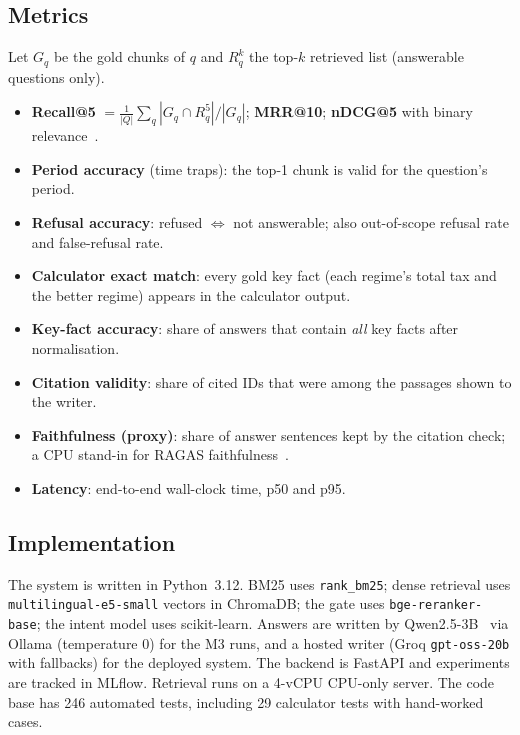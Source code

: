 \documentclass[conference]{IEEEtran}
\begin{document}
\subsection{Metrics}
Let $G_q$ be the gold chunks of $q$ and $R_q^k$ the top-$k$ retrieved list (answerable questions only).
\begin{itemize}
\item \textbf{Recall@5} $=\frac{1}{|Q|}\sum_q |G_q\cap R_q^5|/|G_q|$; \textbf{MRR@10}; \textbf{nDCG@5} with binary
relevance~\cite{jarvelin2002ndcg}.
\item \textbf{Period accuracy} (time traps): the top-1 chunk is valid for the question's period.
\item \textbf{Refusal accuracy}: refused $\Leftrightarrow$ not answerable; also out-of-scope refusal rate and
false-refusal rate.
\item \textbf{Calculator exact match}: every gold key fact (each regime's total tax and the better regime)
appears in the calculator output.
\item \textbf{Key-fact accuracy}: share of answers that contain \emph{all} key facts after normalisation.
\item \textbf{Citation validity}: share of cited IDs that were among the passages shown to the writer.
\item \textbf{Faithfulness (proxy)}: share of answer sentences kept by the citation check; a CPU stand-in for
RAGAS faithfulness~\cite{es2024ragas}.
\item \textbf{Latency}: end-to-end wall-clock time, p50 and p95.
\end{itemize}

\subsection{Implementation}
The system is written in Python~3.12. BM25 uses \texttt{rank\_bm25}; dense retrieval uses
\texttt{multilingual-e5-small} vectors in ChromaDB; the gate uses \texttt{bge-reranker-base}; the intent model uses
scikit-learn. Answers are written by Qwen2.5-3B~\cite{qwen2024} via Ollama
(temperature 0) for the M3 runs, and a hosted writer (Groq \texttt{gpt-oss-20b} with fallbacks) for the
deployed system. The backend is FastAPI and experiments are tracked in MLflow. Retrieval runs on a 4-vCPU CPU-only server. The code base
has 246 automated tests, including 29 calculator tests with hand-worked cases.

\end{document}
